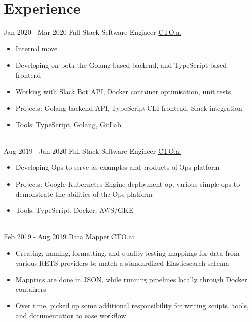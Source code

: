 \documentclass[letterpaper]{twentysecondcv} %
\begin{document}
\makeprofile %


\section{Experience}

\begin{twenty} %
	\twentyitem
	{Jan 2020 -}
	{Mar 2020}
	{Full Stack Software Engineer}
	{\href{http://cto.ai/}{CTO.ai}}
	{}
	{\begin{itemize}
		\item Internal move
		\item Developing on both the Golang based backend, and TypeScript based frontend
		\item Working with Slack Bot API, Docker container optimisation, unit tests
		\item Projects: Golang backend API, TypeScript CLI frontend, Slack integration
		\item Tools: TypeScript, Golang, GitLab
		\end{itemize}}
	\\
	\twentyitem
	{Aug 2019 -}
	{Jan 2020}
	{Full Stack Software Engineer}
	{\href{http://cto.ai/}{CTO.ai}}
	{}
	{\begin{itemize}
		\item Developing Ops to serve as examples and products of Ops platform
		\item Projects: Google Kubernetes Engine deployment op, various simple ops to demonstrate the abilities of the Ops platform
		\item Tools: TypeScript, Docker, AWS/GKE
		\end{itemize}}
	\\
	\twentyitem
	{Feb 2019 -}
	{Aug 2019}
	{Data Mapper}
	{\href{http://cto.ai/}{CTO.ai}}
	{}
	{\begin{itemize}
		\item Creating, naming, formatting, and quality testing mappings for data from various RETS providers to match a standardized Elasticsearch schema
		\item Mappings are done in JSON, while running pipelines locally through Docker containers
		\item Over time, picked up some additional responsibility for writing scripts, tools, and documentation to ease workflow

\end{itemize}}
\end{twenty}
\end{document}
